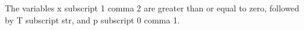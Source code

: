 The variables x subscript 1 comma 2 are greater than or equal to zero, followed by T subscript str, and p subscript 0 comma 1.